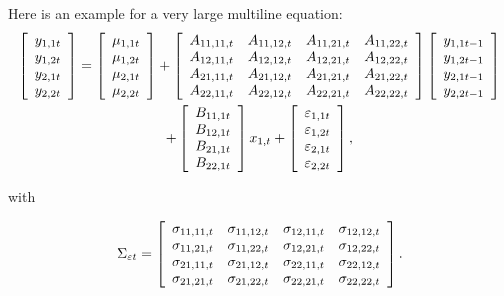 \documentclass[Theme1]{{template_material/eurostat}}
\begin{document}
Here is an example for a very large multiline equation:
\begin{multline}
\left[
\begin{array}
[c]{c}%
y_{1,1t}\\
y_{1,2t}\\
y_{2,1t}\\
y_{2,2t}%
\end{array}
\right]  =\left[
\begin{array}
[c]{c}%
\mu_{1,1t}\\
\mu_{1,2t}\\
\mu_{2,1t}\\
\mu_{2,2t}%
\end{array}
\right]  +\left[
\begin{array}
[c]{cccc}%
A_{11,11,t} & A_{11,12,t} & A_{11,21,t} & A_{11,22,t}\\
A_{12,11,t} & A_{12,12,t} & A_{12,21,t} & A_{12,22,t}\\
A_{21,11,t} & A_{21,12,t} & A_{21,21,t} & A_{21,22,t}\\
A_{22,11,t} & A_{22,12,t} & A_{22,21,t} & A_{22,22,t}%
\end{array}
\right]  \left[
\begin{array}
[c]{c}%
y_{1,1t-1}\\
y_{1,2t-1}\\
y_{2,1t-1}\\
y_{2,2t-1}%
\end{array}
\right] \\
+ \left[
\begin{array}
[c]{c}%
B_{11,1t}\\
B_{12,1t}\\
B_{21,1t}\\
B_{22,1t}%
\end{array}
\right]  x_{1,t}+\left[
\begin{array}
[c]{c}%
\varepsilon_{1,1t}\\
\varepsilon_{1,2t}\\
\varepsilon_{2,1t}\\
\varepsilon_{2,2t}%
\end{array}
\right]  , \label{example2}%
\end{multline}


with%

\[
\Sigma_{\varepsilon t}=\left[
\begin{array}
[c]{cccc}%
\sigma_{11,11,t} & \sigma_{11,12,t} & \sigma_{12,11,t} & \sigma_{12,12,t}\\
\sigma_{11,21,t} & \sigma_{11,22,t} & \sigma_{12,21,t} & \sigma_{12,22,t}\\
\sigma_{21,11,t} & \sigma_{21,12,t} & \sigma_{22,11,t} & \sigma_{22,12,t}\\
\sigma_{21,21,t} & \sigma_{21,22,t} & \sigma_{22,21,t} & \sigma_{22,22,t}%
\end{array}
\right]  .
\]
\end{document}
